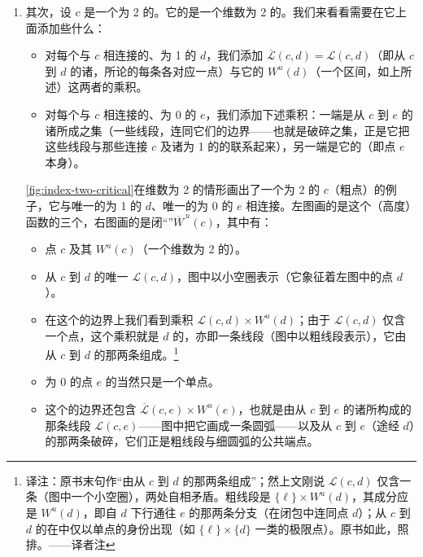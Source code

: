 \begin{example}
\begin{enumerate}[label=(\arabic*)]
\item 其次，设 $c$ 是一个\trIndex{}为 2 的\trCriticalPoint{}。它的\trUnstableManifold{}是一个维数为 2 的\trOpen{}\trDisk{}。我们来看看需要在它上面添加些什么：
\begin{itemize}
\item 对每个与 $c$ 相连接的、\trIndex{}为 1 的\trCriticalPoint{} $d$，我们添加 $\overline{\mathcal{L}}(c,d)=\mathcal{L}(c,d)$（即从 $c$ 到 $d$ 的诸\trTrajectory，所论的每条\trTrajectory{}各对应一点）与它的\trUnstableManifold{} $W^u(d)$（一个\trOpen{}区间，如上所述）这两者的乘积。
\item 对每个与 $c$ 相连接的、\trIndex{}为 0 的\trCriticalPoint{} $e$，我们添加下述乘积：一端是从 $c$ 到 $e$ 的诸\trTrajectory{}所成之集（一些\trOpen{}线段，连同它们的边界——也就是破碎\trTrajectory{}之集，正是它把这些线段与那些连接 $c$ 及诸\trIndex{}为 1 的\trCriticalPoint{}的\trTrajectory{}联系起来），另一端是它的\trUnstableManifold（即点 $e$ 本身）。
\end{itemize}

\cref{fig:index-two-critical}在维数为 2 的情形画出了一个\trIndex{}为 2 的\trCriticalPoint{} $c$（粗点）的例子，它与唯一的\trIndex{}为 1 的\trCriticalPoint{} $d$、唯一的\trIndex{}为 0 的\trCriticalPoint{} $e$ 相连接。左图画的是这个（高度）函数的三个\trCriticalPoint，右图画的是闭“\trCellular”$\overline{W}^{\,u}(c)$，其中有：
\begin{itemize}
\item 点 $c$ 及其\trUnstableManifold{} $W^u(c)$（一个维数为 2 的\trOpen{}\trDisk）。
\item 从 $c$ 到 $d$ 的唯一\trTrajectory{} $\mathcal{L}(c,d)$，图中以小空圈表示（它象征着左图中的点 $d$）。
\item 在这个\trDisk{}的边界上我们看到乘积 $\mathcal{L}(c,d)\times W^u(d)$；由于 $\mathcal{L}(c,d)$ 仅含一个点，这个乘积就是 $d$ 的\trUnstableManifold，亦即一条\trOpen{}线段（图中以粗线段表示），它由从 $c$ 到 $d$ 的那两条\trTrajectory{}组成。\footnote{译注：原书末句作“由从 $c$ 到 $d$ 的那两条\trTrajectory{}组成”；然上文刚说 $\mathcal{L}(c,d)$ 仅含一条\trTrajectory{}（图中一个小空圈），两处自相矛盾。粗线段是 $\{\ell\}\times W^u(d)$，其成分应是 $W^u(d)$，即自 $d$ 下行通往 $e$ 的那两条分支（在闭包中连同点 $d$）；从 $c$ 到 $d$ 的\trTrajectory{}在\trCellular{}中仅以单点的身份出现（如 $\{\ell\}\times\{d\}$ 一类的极限点）。原书如此，照排。——译者注}
\item \trIndex{}为 0 的点 $e$ 的\trUnstableManifold{}当然只是一个单点。
\item 这个\trDisk{}的边界还包含 $\overline{\mathcal{L}}(c,e)\times W^u(e)$，也就是由从 $c$ 到 $e$ 的诸\trTrajectory{}所构成的那条\trOpen{}线段 $\mathcal{L}(c,e)$——图中把它画成一条圆弧——以及从 $c$ 到 $e$（途经 $d$）的那两条破碎\trTrajectory，它们正是粗线段与细圆弧的公共端点。
\end{itemize}
\end{enumerate}
\end{example}


